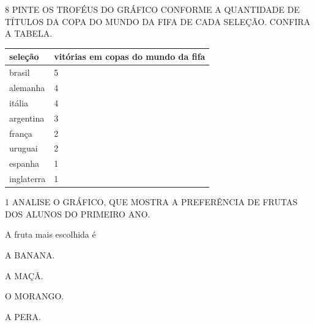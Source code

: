 \num{8} PINTE OS TROFÉUS DO GRÁFICO CONFORME A QUANTIDADE DE TÍTULOS DA COPA DO
MUNDO DA FIFA DE CADA SELEÇÃO. CONFIRA A TABELA.

\begin{longtable}[]{@{}ll@{}}
\toprule
seleção & vitórias em copas do mundo da fifa\tabularnewline
\midrule
\endhead
brasil & 5\tabularnewline
alemanha & 4\tabularnewline
itália & 4\tabularnewline
argentina & 3\tabularnewline
frança & 2\tabularnewline
uruguai & 2\tabularnewline
espanha & 1\tabularnewline
inglaterra & 1\tabularnewline
\bottomrule
\end{longtable}




\num{1} ANALISE O GRÁFICO, QUE MOSTRA A PREFERÊNCIA DE FRUTAS DOS ALUNOS DO PRIMEIRO ANO.


A fruta mais escolhida é

\begin{escolha}
\item A BANANA.

\item A MAÇÃ.

\item O MORANGO.

\item A PERA.
\end{escolha}


